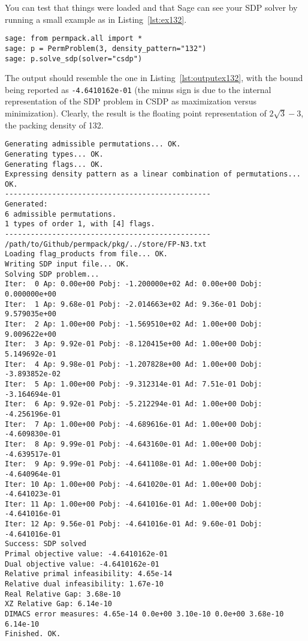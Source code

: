 \documentclass[12pt, a4paper, twoside]{report}
\begin{document}
You can test that things were loaded and that Sage can see your SDP solver by running a small example as in Listing~\ref{lst:ex132}.
 {}
\begin{lstlisting}
sage: from permpack.all import *
sage: p = PermProblem(3, density_pattern="132")
sage: p.solve_sdp(solver="csdp")
\end{lstlisting}
The output should resemble the one in Listing~\ref{lst:outputex132}, with the bound being reported as \texttt{-4.6410162e-01} (the minus sign is due to the internal representation of the SDP problem in CSDP as maximization versus minimization). Clearly, the result is the floating point representation of $2\sqrt{3}-3$, the packing density of 132. 
\begin{lstlisting}
Generating admissible permutations... OK.
Generating types... OK.
Generating flags... OK.
Expressing density pattern as a linear combination of permutations... OK.
------------------------------------------------
Generated:
6 admissible permutations.
1 types of order 1, with [4] flags.
------------------------------------------------
/path/to/Github/permpack/pkg/../store/FP-N3.txt
Loading flag_products from file... OK.
Writing SDP input file... OK.
Solving SDP problem...
Iter:  0 Ap: 0.00e+00 Pobj: -1.200000e+02 Ad: 0.00e+00 Dobj:  0.000000e+00 
Iter:  1 Ap: 9.68e-01 Pobj: -2.014663e+02 Ad: 9.36e-01 Dobj:  9.579035e+00 
Iter:  2 Ap: 1.00e+00 Pobj: -1.569510e+02 Ad: 1.00e+00 Dobj:  9.009622e+00 
Iter:  3 Ap: 9.92e-01 Pobj: -8.120415e+00 Ad: 1.00e+00 Dobj:  5.149692e-01 
Iter:  4 Ap: 9.98e-01 Pobj: -1.207828e+00 Ad: 1.00e+00 Dobj: -3.893852e-02 
Iter:  5 Ap: 1.00e+00 Pobj: -9.312314e-01 Ad: 7.51e-01 Dobj: -3.164694e-01 
Iter:  6 Ap: 9.92e-01 Pobj: -5.212294e-01 Ad: 1.00e+00 Dobj: -4.256196e-01 
Iter:  7 Ap: 1.00e+00 Pobj: -4.689616e-01 Ad: 1.00e+00 Dobj: -4.609830e-01 
Iter:  8 Ap: 9.99e-01 Pobj: -4.643160e-01 Ad: 1.00e+00 Dobj: -4.639517e-01 
Iter:  9 Ap: 9.99e-01 Pobj: -4.641108e-01 Ad: 1.00e+00 Dobj: -4.640964e-01 
Iter: 10 Ap: 1.00e+00 Pobj: -4.641020e-01 Ad: 1.00e+00 Dobj: -4.641023e-01 
Iter: 11 Ap: 1.00e+00 Pobj: -4.641016e-01 Ad: 1.00e+00 Dobj: -4.641016e-01 
Iter: 12 Ap: 9.56e-01 Pobj: -4.641016e-01 Ad: 9.60e-01 Dobj: -4.641016e-01 
Success: SDP solved
Primal objective value: -4.6410162e-01 
Dual objective value: -4.6410162e-01 
Relative primal infeasibility: 4.65e-14 
Relative dual infeasibility: 1.67e-10 
Real Relative Gap: 3.68e-10 
XZ Relative Gap: 6.14e-10 
DIMACS error measures: 4.65e-14 0.0e+00 3.10e-10 0.0e+00 3.68e-10 6.14e-10
Finished. OK.
\end{lstlisting}
\end{document}
